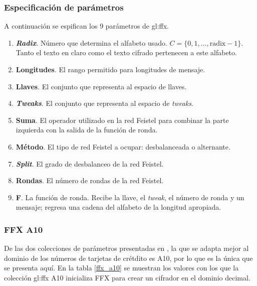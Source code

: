 \subsubsection{Especificación de parámetros}

A continuación se espifican los 9 parámetros de \gls{gl:ffx}.

\begin{enumerate}

  \item \textbf{\textit{Radix}}.
    Número que determina el alfabeto usado.
    $ C = \{ 0, 1, \dots, \text{radix} - 1\} $. Tanto el texto en claro como
    el texto cifrado pertenecen a este alfabeto.

  \item \textbf{Longitudes}.
    El rango permitido para longitudes de mensaje.

  \item \textbf{Llaves}.
    El conjunto que representa al espacio de llaves.

  \item \textbf{\textit{Tweaks}}.
    El conjunto que representa al espacio de \textit{tweaks}.

  \item \textbf{Suma}.
    El operador utilizado en la red Feistel para combinar la parte izquierda
    con la salida de la función de ronda.

  \item \textbf{Método}.
    El tipo de red Feistel a ocupar: desbalanceada o alternante.

  \item \textbf{\textit{Split}}.
    El grado de desbalanceo de la red Feistel.

  \item \textbf{Rondas}.
    El número de rondas de la red Feistel.

  \item \textbf{F}.
    La función de ronda. Recibe la llave, el \textit{tweak}, el número de
    ronda y un mensaje; regresa una cadena del alfabeto de la longitud
    apropiada.

\end{enumerate}

\subsubsection{FFX A10}

De las dos colecciones de parámetros presentadas en \cite{ffx_2}, la que se
adapta mejor al dominio de los números de tarjetas de crétdito es A10, por lo
que es la única que se presenta aquí. En la tabla \ref{ffx_a10} se muestran los
valores con los que la colección \gls{gl:ffx} A10 inicializa FFX para crear un
cifrador en el dominio decimal.

